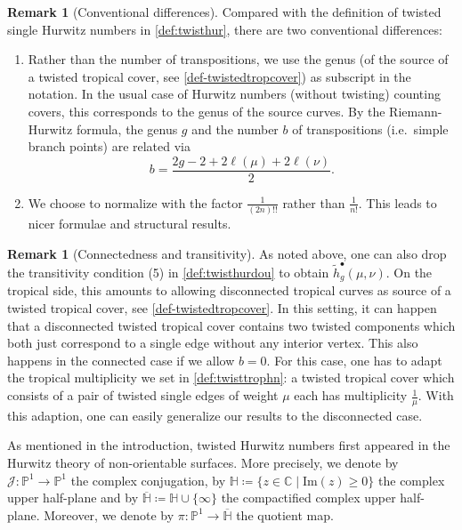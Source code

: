 \documentclass[11pt]{article}
\theoremstyle{definition}
\newtheorem{rema}[theo]{Remark}
\numberwithin{equation}{section}
\begin{document}
\begin{rema}[Conventional differences]
Compared with the definition of twisted single Hurwitz numbers in \cref{def:twisthur}, there are two conventional differences:
\begin{enumerate}
    \item Rather than the number of transpositions, we use the genus (of the source of a twisted tropical cover, see \cref{def-twistedtropcover}) as subscript in the notation. In the usual case of Hurwitz numbers (without twisting) counting covers, this corresponds to the genus of the source curves. By the Riemann-Hurwitz formula, the genus $g$ and the number $b$ of transpositions (i.e.\ simple branch points) are related via
    $$b=\frac{2g-2+2\ell(\mu)+2\ell(\nu)}{2}.$$

    \item We choose to normalize with the factor $\frac{1}{(2n)!!}$ rather than $\frac{1}{n!}$. This leads to nicer formulae and structural results.
\end{enumerate}

\end{rema}
\begin{rema}[Connectedness and transitivity]
    As noted above, one can also drop the transitivity condition (5) in \cref{def:twisthurdou} to obtain $\tilde{h}_g^\bullet(\mu,\nu)$. On the tropical side, this amounts to allowing disconnected tropical curves as source of a twisted tropical cover, see \cref{def-twistedtropcover}. In this setting, it can happen that a disconnected twisted tropical cover contains two twisted components which both just correspond to a single edge without any interior vertex. This also happens in the connected case if we allow $b=0$. For this case, one has to adapt the tropical multiplicity we set in \cref{def:twisttrophn}: a twisted tropical cover which consists of a pair of twisted single edges of weight $\mu$ each has multiplicity $\frac{1}{\mu}$. With this adaption, one can easily generalize our results to the disconnected case.
\end{rema}

As mentioned in the introduction, twisted Hurwitz numbers first appeared in the Hurwitz theory of non-orientable surfaces. More precisely, we denote by $\mathcal{J}\colon\mathbb{P}^1\to\mathbb{P}^1$ the complex conjugation, by $\mathbb{H}\coloneqq\{z\in\mathbb{C}\mid\mathrm{Im}(z)\ge0\}$ the complex upper half-plane and by $\overline{\mathbb{H}}\coloneqq\mathbb{H}\cup\{\infty\}$ the compactified complex upper half-plane. Moreover, we denote by $\pi\colon\mathbb{P}^1\to\overline{\mathbb{H}}$ the quotient map.
\end{document}
